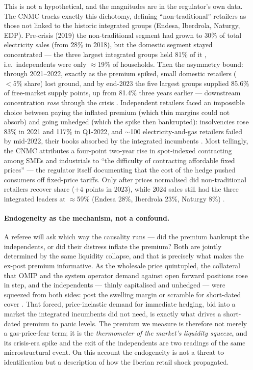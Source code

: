 \documentclass[11pt,a4paper]{article}
\begin{document}
This is not a hypothetical, and the magnitudes are in the regulator's own data.
The CNMC tracks exactly this dichotomy, defining ``non-traditional'' retailers as
those not linked to the historic integrated groups (Endesa, Iberdrola, Naturgy,
EDP). Pre-crisis (2019) the non-traditional segment had grown to 30\% of total
electricity sales (from 28\% in 2018), but the domestic segment stayed
concentrated --- the three largest integrated groups held 81\% of it
\citep{cnmc_minorista2019}, i.e.\ independents were only $\approx$19\% of
households. Then the asymmetry bound: through 2021--2022, exactly as the premium
spiked, small domestic retailers ($<5\%$ share) lost ground, and by end-2023 the
five largest groups supplied 85.6\% of free-market supply points, up from 81.4\%
three years earlier --- downstream concentration \emph{rose} through the crisis
\citep{cnmc_cambios2023}. Independent retailers faced an impossible choice between
paying the inflated premium (which thin margins could not absorb) and going
unhedged (which the spike then bankrupted): insolvencies rose 83\% in 2021 and
117\% in Q1-2022, and $\sim$100 electricity-and-gas retailers failed by mid-2022,
their books absorbed by the integrated incumbents
\citep{invertia2022,elindependiente2022}. Most tellingly, the CNMC attributes a
four-point two-year rise in spot-indexed contracting among SMEs and industrials to
``the difficulty of contracting affordable fixed prices'' \citep{cnmc_flex2024} ---
the regulator itself documenting that the cost of the hedge pushed consumers off
fixed-price tariffs. Only after prices normalised did non-traditional retailers
recover share ($+4$ points in 2023), while 2024 sales still had the three
integrated leaders at $\approx$59\% (Endesa 28\%, Iberdrola 23\%, Naturgy 8\%)
\citep{cnmc_minorista2024}.

\paragraph{Endogeneity as the mechanism, not a confound.} A referee will ask which
way the causality runs --- did the premium bankrupt the independents, or did their
distress inflate the premium? Both are jointly determined by the same liquidity
collapse, and that is precisely what makes the ex-post premium informative. As the
wholesale price quintupled, the collateral that OMIP and the system operator demand
against open forward positions rose in step, and the independents --- thinly
capitalised and unhedged --- were squeezed from both sides: post the swelling margin
or scramble for short-dated cover \citep{invertia2022}. That forced,
price-inelastic demand for immediate hedging, bid into a market the integrated
incumbents did not need, is exactly what drives a short-dated premium to panic
levels. The premium we measure is therefore not merely a gas-price-fear term; it is
the \emph{thermometer of the market's liquidity squeeze}, and its crisis-era spike
and the exit of the independents are two readings of the same microstructural event.
On this account the endogeneity is not a threat to identification but a description
of how the Iberian retail shock propagated.
\end{document}
